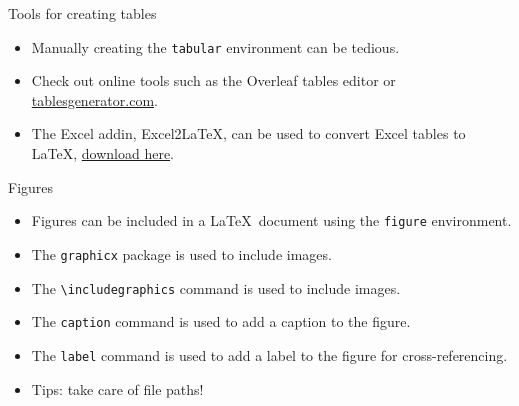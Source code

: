 \documentclass[t,12pt,xcolor=dvipsnames]{beamer}
\begin{document}
\begin{frame}{Tools for creating tables}
    \begin{itemize}
        \item Manually creating the \texttt{tabular} environment can be tedious.
        \item Check out online tools such as the Overleaf tables editor or \href{tablesgenerator.com}{tablesgenerator.com}.
        \item The Excel addin, Excel2LaTeX, can be used to convert Excel tables to \LaTeX, \href{https://github.com/ivankokan/Excel2LaTeX/releases/tag/v3.5.0}{download here}.
    \end{itemize}
\end{frame}

\begin{frame}{Figures}
    \begin{itemize}
        \item Figures can be included in a \LaTeX \ document using the \texttt{figure} environment.
        \item The \texttt{graphicx} package is used to include images.
        \item The \texttt{\textbackslash includegraphics} command is used to include images.
        \item The \texttt{caption} command is used to add a caption to the figure.
        \item The \texttt{label} command is used to add a label to the figure for cross-referencing.
        \item Tips: take care of file paths!
    \end{itemize}
\end{frame}


\end{document}
